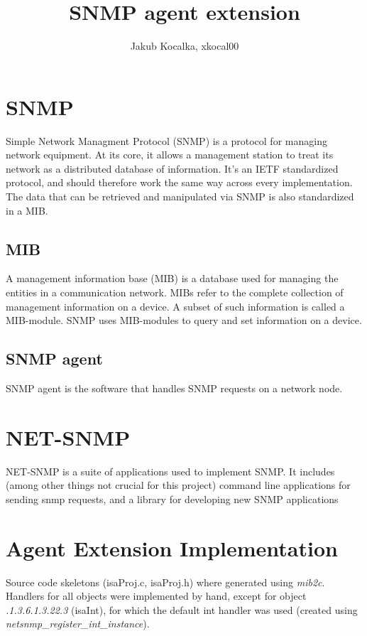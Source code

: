 \documentclass[10pt,a4paper]{article}
\author{Jakub Kocalka, xkocal00}
\title{SNMP agent extension}
\begin{document}
	\begin{titlepage}
		\maketitle
	\end{titlepage}
	
	\tableofcontents
	
	\section{SNMP}
	\label{sec:snmp}
	Simple Network Managment Protocol (SNMP) is a protocol for managing network equipment.\cite{net-snmp.org} At its core, it allows a management station to treat its network as a distributed database of information. It's an IETF standardized protocol, and should therefore work the same way across every implementation. The data that can be retrieved and manipulated via SNMP is also standardized in a MIB. \cite{tut:snmp}
	
	\subsection{MIB}
	\label{subsec:mib}
	A management information base (MIB) is a database used for managing the entities in a communication network. MIBs refer to the complete collection of management information on a device. A subset of such information is called a MIB-module. SNMP uses MIB-modules to query and set information on a device.
	
	\subsection{SNMP agent}
	\label{subsec:snmp_agent}
	SNMP agent is the software that handles SNMP requests on a network node.
	
	\section{NET-SNMP}
	\label{sec:net-snmp}
	NET-SNMP is a suite of applications used to implement SNMP. It includes (among other things not crucial for this project) command line applications for sending snmp requests, and a library for developing new SNMP applications \cite{net-snmp.org}
	
	\section{Agent Extension Implementation}
	\label{sec:implementation}
	Source code skeletons (isaProj.c, isaProj.h) where generated using \emph{mib2c}. Handlers for all objects were implemented by hand, except for object \emph{.1.3.6.1.3.22.3} (isaInt), for which the default int handler was used (created using \emph{netsnmp\_register\_int\_instance}).
	
\end{document}
